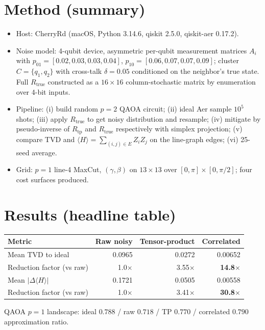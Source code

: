 \documentclass[11pt]{article}
\begin{document}
\section{Method (summary)}
\begin{itemize}
  \item Host: CherryRd (macOS, Python 3.14.6, qiskit 2.5.0, qiskit-aer 0.17.2).
  \item Noise model: 4-qubit device, asymmetric per-qubit measurement matrices
    $A_i$ with $p_{01}=[0.02,0.03,0.03,0.04]$, $p_{10}=[0.06,0.07,0.07,0.09]$;
    cluster $C=\{q_1,q_2\}$ with cross-talk $\delta=0.05$ conditioned on the
    neighbor's true state. Full $R_\text{true}$ constructed as a $16\times16$
    column-stochastic matrix by enumeration over 4-bit inputs.
  \item Pipeline: (i) build random $p{=}2$ QAOA circuit; (ii) ideal Aer sample
    $10^5$ shots; (iii) apply $R_\text{true}$ to get noisy distribution and
    resample; (iv) mitigate by pseudo-inverse of $R_\text{tp}$ and $R_\text{true}$
    respectively with simplex projection; (v) compare TVD and
    $\langle H\rangle=\sum_{(i,j)\in E} Z_iZ_j$ on the line-graph edges;
    (vi) 25-seed average.
  \item Grid: $p{=}1$ line-4 MaxCut, $(\gamma,\beta)$ on $13\times13$ over
    $[0,\pi]\times[0,\pi/2]$; four cost surfaces produced.
\end{itemize}

\section{Results (headline table)}
\begin{center}
\begin{tabular}{lrrr}
\toprule
Metric & Raw noisy & Tensor-product & Correlated \\
\midrule
Mean TVD to ideal              & 0.0965 & 0.0272 & 0.00652 \\
Reduction factor (vs raw)      & 1.0$\times$ & 3.55$\times$ & \textbf{14.8$\times$} \\
Mean $|\Delta\langle H\rangle|$ & 0.1721 & 0.0505 & 0.00558 \\
Reduction factor (vs raw)      & 1.0$\times$ & 3.41$\times$ & \textbf{30.8$\times$} \\
\bottomrule
\end{tabular}
\end{center}

QAOA $p{=}1$ landscape: ideal $0.788$ / raw $0.718$ / TP $0.770$ / correlated $\mathbf{0.790}$
approximation ratio.
\end{document}
